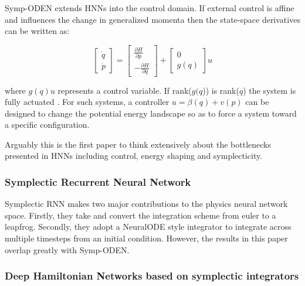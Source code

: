 \documentclass{article}
\begin{document}
Symp-ODEN \cite{zhong_symplectic_2019} extends HNNs into the control domain. If external control is affine and influences the change in generalized momenta then the state-space derivatives can be written as:

\begin{equation}
\begin{bmatrix}
\dot{q} \\
\dot{p}
\end{bmatrix}
= 
\begin{bmatrix}
\frac{\partial H}{\partial p} \\
-\frac{\partial H}{\partial q}
\end{bmatrix}
+
\begin{bmatrix}
0 \\
g(q)
\end{bmatrix} u
\end{equation}

where $g(q)u$ represents a control variable. If rank($g(q$)) is rank($q$) the system is fully actuated \cite{zhong_symplectic_2019}. For such systems, a controller $u = \beta(q) +v(p) $ can be designed to change the potential energy landscape so as to force a system toward a specific configuration.

%

Arguably this is the first paper to think extensively about the bottlenecks presented in HNNs including control, energy shaping and symplecticity. 



\subsubsection{Symplectic Recurrent Neural Network}

Symplectic RNN \cite{chen_symplectic_2020} makes two major contributions to the physics neural network space. Firstly, they take  and convert the integration scheme from euler to a leapfrog. Secondly, they adopt a NeuralODE style integrator to integrate across multiple timesteps from an initial condition. However, the results in this paper overlap greatly with Symp-ODEN. 

\subsubsection{Deep Hamiltonian Networks based on symplectic integrators}
\end{document}

